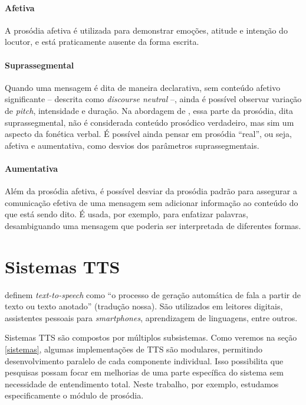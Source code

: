 \paragraph{Afetiva} A prosódia afetiva é utilizada para demonstrar emoções,
atitude e intenção do locutor, e está praticamente ausente da forma escrita.

\paragraph{Suprassegmental} Quando uma mensagem é dita de maneira declarativa,
sem conteúdo afetivo significante -- descrita como \emph{discourse neutral} --,
ainda é possível observar variação de \emph{pitch}, intensidade e duração. Na
abordagem de , essa parte da prosódia, dita
suprassegmental, não é considerada conteúdo prosódico verdadeiro, mas sim um
aspecto da fonética verbal. É possível ainda pensar em prosódia ``real'', ou
seja, afetiva e aumentativa, como desvios dos parâmetros suprassegmentais.

\paragraph{Aumentativa} Além da prosódia afetiva, é possível desviar da prosódia
padrão para assegurar a comunicação efetiva de uma mensagem sem adicionar
informação ao conteúdo do que está sendo dito. É usada, por exemplo, para
enfatizar palavras, desambiguando uma mensagem que poderia ser interpretada de
diferentes formas.

\section{Sistemas TTS}
 definem \emph{text-to-speech} como ``o processo de geração
automática de fala a partir de texto ou texto anotado'' (tradução nossa). São
utilizados em leitores digitais, assistentes pessoais para \emph{smartphones},
aprendizagem de linguagens, entre outros.

Sistemas TTS são compostos por múltiplos subsistemas. Como veremos na seção
\ref{sistemas}, algumas implementações de TTS são modulares, permitindo
desenvolvimento paralelo de cada componente individual. Isso possibilita que
pesquisas possam focar em melhorias de uma parte específica do sistema sem
necessidade de entendimento total. Neste trabalho, por exemplo, estudamos
especificamente o módulo de prosódia. %

